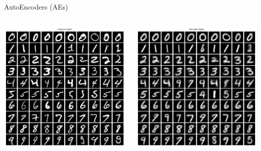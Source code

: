 \begin{frame}[allowframebreaks]{AutoEncoders (AEs)}
    \begin{columns}
        \begin{center}
            \includegraphics[width=1\textwidth]{../resources/ae/mnist_original_digits.png}
        \end{center}

        \begin{center}
            \includegraphics[width=1\textwidth]{../resources/ae/mnist_decoded_digits.png}
        \end{center}
    \end{columns}


\end{frame}
